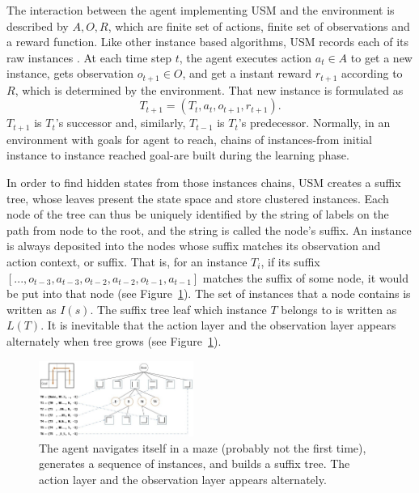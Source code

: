 \documentclass{article}
\begin{document}
The interaction between the agent implementing USM and the environment is described by
$A, O, R$, which are finite set of actions, finite set of observations and a reward function.
Like other instance based algorithms, USM records each of its raw instances
\cite{mccallum1995instance}. At each time step $t$, the agent executes action
$a_t \in A$ to get a new instance, gets observation $o_{t+1} \in O$, and get a
instant reward $r_{t+1}$ according to $R$, which is determined by the environment.
That new instance is formulated as
\begin{equation}
  T_{t+1}= (T_t, a_t, o_{t+1}, r_{t+1}). \label{equ:instance}
\end{equation}
$T_{t+1}$ is $T_t$'s successor and, similarly, $T_{t-1}$ is $T_t$'s predecessor.
Normally, in an environment with goals for agent to reach, chains of instances-from
initial instance to instance reached goal-are built during the learning phase.

In order to find hidden states from those instances chains, USM creates a suffix tree,
whose leaves present the state space and store clustered instances. Each node of the tree
can thus be uniquely identified by the string of labels on the path from node to the root,
and the string is called the node’s suffix. An instance is always deposited into the
nodes whose suffix matches its observation and action context, or suffix. That is,
for an instance $T_i$, if its suffix $[..., o_{t-3}, a_{t-3}, o_{t-2}, a_{t-2}, o_{t-1}, a_{t-1}]$
matches the suffix of some node, it would be put into that node (see Figure~\ref{fig:suffix tree}).
The set of instances that a node contains is written as $I(s)$. The suffix tree leaf which
instance $T$ belongs to is written as $L(T)$. It is inevitable that the action layer and
the observation layer appears alternately when tree grows (see Figure~\ref{fig:suffix tree}).

\begin{figure}[b]
  \centering
    \includegraphics[width=0.45\textwidth]{usm_sample.jpg}
  \caption{The agent navigates itself in a maze (probably not the first time), generates
  a sequence of instances, and builds a suffix tree. The action layer and
  the observation layer appears alternately.}
  \label{fig:suffix tree}
\end{figure}
\end{document}
